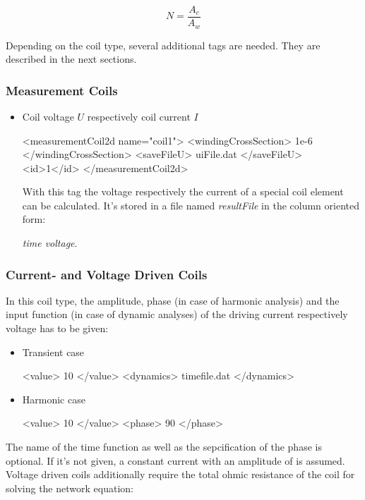 \begin{equation}
  \label{eq:N}
  N=\frac{A_c}{A_w}
\end{equation}

\noindent
Depending on the coil type, several additional tags are needed. They
are described in the next sections.


\subsubsection{Measurement Coils}

\begin{itemize}
\item Coil voltage $U$ respectively coil current $I$

\begin{xmllisting}
<measurementCoil2d name="coil1">
  <windingCrossSection> 1e-6 </windingCrossSection>
   <saveFileU>  uiFile.dat  </saveFileU> 
  <id>1</id>
</measurementCoil2d>
\end{xmllisting}

   With this tag the voltage respectively the current of a
   special coil element can be calculated. It's stored in a file
   named {\em resultFile} in the column oriented form:

   {\em time voltage}.

\end{itemize}

\subsubsection{Current- and Voltage Driven Coils}
In this coil type, the amplitude, phase (in case of harmonic analysis)
and the input function (in case of dynamic analyses) of the driving
current respectively voltage has to be given:

\begin{itemize}
\item Transient case
\begin{xmllisting}
<value>       10           </value>
<dynamics>    timefile.dat </dynamics>
\end{xmllisting}

\item Harmonic case
\begin{xmllisting}
<value>       10           </value>
<phase>       90           </phase>
\end{xmllisting}
\end{itemize}

\noindent
The name of the time function as well as the sepcification of the
phase is optional. If it's not given, a constant current with an
amplitude of {} is assumed.  
Voltage driven coils additionally require the total ohmic resistance
of the coil for solving the network equation:


